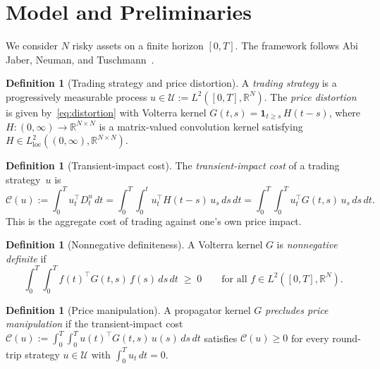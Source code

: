 \documentclass[12pt]{article}
\theoremstyle{definition}
\newtheorem{definition}[theorem]{Definition}
\theoremstyle{remark}
\newcommand{\R}{\mathbb{R}}
\begin{document}
\section{Model and Preliminaries}\label{sec:model}

We consider $N$ risky assets on a finite horizon $[0,T]$.
The framework follows Abi Jaber, Neuman, and Tuschmann~\cite{AbiJaberNeumanTuschmann2026}.

\begin{definition}[Trading strategy and price distortion]
A \emph{trading strategy} is a progressively measurable process
$u\in\mathcal{U}:=L^2([0,T],\R^N)$.  The \emph{price distortion} is given
by~\eqref{eq:distortion} with Volterra kernel $G(t,s)=\mathbf{1}_{t\ge s}\,H(t-s)$,
where $H:(0,\infty)\to\R^{N\times N}$ is a matrix-valued convolution kernel satisfying
$H\in L^2_{\mathrm{loc}}((0,\infty),\R^{N\times N})$.
\end{definition}

\begin{definition}[Transient-impact cost]
The \emph{transient-impact cost} of a trading strategy~$u$ is
\begin{equation}\label{eq:cost}
  \mathcal{C}(u) := \int_0^T u_t^\top D_t^u\,dt
  = \int_0^T\!\int_0^t u_t^\top H(t-s)\,u_s\,ds\,dt
  = \int_0^T\!\int_0^T u_t^\top G(t,s)\,u_s\,ds\,dt.
\end{equation}
This is the aggregate cost of trading against one's own price impact.
\end{definition}

\begin{definition}[Nonnegative definiteness]\label{def:nnd}
A Volterra kernel $G$ is \emph{nonnegative definite} if
\begin{equation}\label{eq:nnd}
  \int_0^T\!\int_0^T f(t)^\top G(t,s)\,f(s)\,ds\,dt \;\ge\; 0
  \qquad\text{for all } f\in L^2([0,T],\R^N).
\end{equation}
\end{definition}

\begin{definition}[Price manipulation]\label{def:manip}
A propagator kernel $G$ \emph{precludes price manipulation} if the transient-impact cost
$\mathcal{C}(u):=\int_0^T\!\int_0^T u(t)^\top G(t,s)\,u(s)\,ds\,dt$
satisfies $\mathcal{C}(u)\ge 0$ for every round-trip strategy
$u\in\mathcal{U}$ with $\int_0^T u_t\,dt = 0$.
\end{definition}
\end{document}
